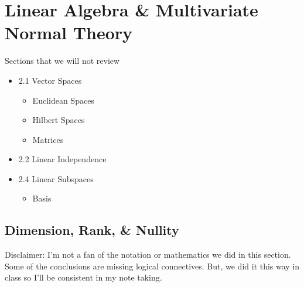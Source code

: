 \documentclass[a4paper]{article}
\begin{document}
\section*{Linear Algebra \& Multivariate Normal Theory}
Sections that we will not review

\begin{itemize}
    \item 2.1 Vector Spaces
        \begin{itemize}
            \item Euclidean Spaces
            \item Hilbert Spaces
            \item Matrices
        \end{itemize}
    \item 2.2 Linear Independence
    \item 2.4 Linear Subspaces
        \begin{itemize}
            \item Basis
        \end{itemize}
\end{itemize}

\subsection*{Dimension, Rank, \& Nullity}%
Disclaimer: I'm not a fan of the notation or mathematics we did in this section. Some of the conclusions are missing logical connectives. But, we did it this way in class so I'll be consistent in my note taking.
\end{document}
